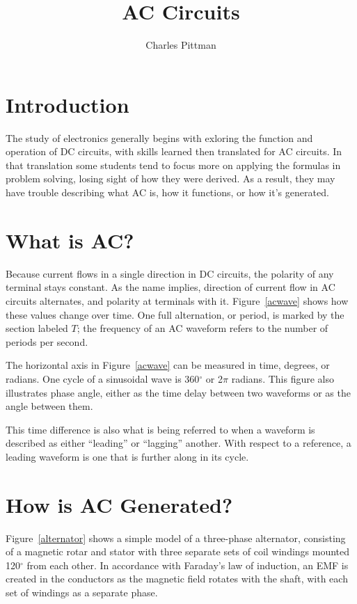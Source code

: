 \documentclass[11pt]{article}
\author{Charles Pittman}
\title{AC Circuits}
\begin{document}
  \maketitle


  \section*{Introduction}
  The study of electronics generally begins with exloring the function and
  operation of \ac{DC} circuits, with skills learned then translated for
  \ac{AC} circuits.  In that translation some students tend to focus more on
  applying the formulas in problem solving, losing sight of how they were
  derived.  As a result, they may have trouble describing what \ac{AC} is, how
  it functions, or how it's generated.

  \section*{What is \ac{AC}?}
  Because current flows in a single direction in \ac{DC} circuits, the polarity
  of any terminal stays constant.  As the name implies, direction of current
  flow in \ac{AC} circuits alternates, and polarity at terminals with it.
  Figure~\ref{acwave} shows how these values change over time.  One full
  alternation, or period, is marked by the section labeled $T$; the frequency
  of an \ac{AC} waveform refers to the number of periods per second.

  The horizontal axis in Figure~\ref{acwave} can be measured in time, degrees,
  or radians.  One cycle of a sinusoidal wave is 360$^\circ$ or 2$\pi$ radians.
  This figure also illustrates phase angle, either as the time delay between
  two waveforms or as the angle between them.

  This time difference is also what is being referred to when a waveform is
  described as either ``leading'' or ``lagging'' another.  With respect to a
  reference, a leading waveform is one that is further along in its cycle.

  \section*{How is \ac{AC} Generated?}
  Figure~\ref{alternator} shows a simple model of a three-phase alternator,
  consisting of a magnetic rotar and stator with three separate sets of coil
  windings mounted 120$^\circ$ from each other.  In accordance with Faraday's
  law of induction, an \ac{EMF} is created in the conductors as the magnetic
  field rotates with the shaft, with each set of windings as a separate phase.
\end{document}
